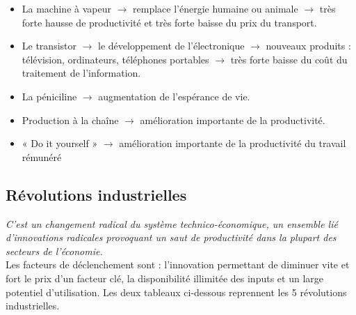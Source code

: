 \begin{itemize}
	\item La machine à vapeur $\rightarrow$ remplace l’énergie humaine ou animale $\rightarrow$ très forte hausse de productivité et très forte baisse du prix du transport.
	      	
	\item Le transistor $\rightarrow$ le développement de l’électronique $\rightarrow$ nouveaux produits : télévision, ordinateurs, téléphones portables $\rightarrow$ très forte baisse du coût du traitement de l’information.
	      	
	\item La péniciline $\rightarrow$ augmentation de l'espérance de vie.
	      	
	\item Production à la chaîne $\rightarrow$ amélioration importante de la productivité.
	      	
	\item « Do it yourself » $\rightarrow$ amélioration importante de la productivité du travail rémunéré
\end{itemize}

\subsection{Révolutions industrielles}
\textit{C'est un changement radical du système technico-économique, un ensemble lié d’innovations radicales provoquant un saut de productivité dans la plupart des secteurs
	de l’économie.} \\
Les facteurs de déclenchement sont : l'innovation permettant de diminuer vite et fort le prix d'un facteur clé, la disponibilité illimitée des inputs et un large  potentiel d'utilisation. Les deux tableaux ci-dessous reprennent les 5 révolutions industrielles. \\


